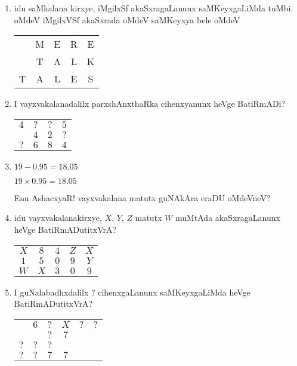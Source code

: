 \begin{enumerate}
\item idu saMkalana kirxye, iMgilxSf akaSxragaLanunx saMKeyxgaLiMda tuMbi. oMdeV iMgilxVSf akaSxrada oMdeV saMKeyxya bele oMdeV
\begin{center}
\begin{tabular}{ccccc}
 & {\rm M} & {\rm E} & {\rm R} & {\rm E}\\
 & {\rm T} & {\rm A} & {\rm L} & {\rm K}\\
\hline
{\rm T} & {\rm A} & {\rm L} & {\rm E} & {\rm S}
\end{tabular}
\end{center}

\item I vayxvakalanadalilx parxshAnxthaRka cihenxyanunx heVge BatiRmADi?
\begin{center}
\begin{tabular}{cccc}
$4$ & $?$ & $?$ & $5$\\
& $4$ & $2$ & $?$\\
\hline
$?$ & $6$ & $8$ & $4$
\end{tabular}
\end{center}

\item $19-0.95=18.05$

$19\times 0.95=18.05$

Enu AshacxyaR! vayxvakalana matutx guNAkAra eraDU oMdeVneV?

\item idu vayxvakalanakirxye, $X$, $Y$, $Z$ matutx $W$ muMtAda akaSxragaLanunx heVge BatiRmADutitxVrA?
\begin{center}
\begin{tabular}{ccccc}
$X$ & $8$ & $4$ & $Z$ & $X$\\
$1$ & $5$ & $0$ & $9$ & $Y$\\
\hline
$W$ & $X$ & $3$ & $0$ & $9$
\end{tabular}
\end{center}

\item I guNalabadhxdalilx $?$ cihenxgaLanunx saMKeyxgaLiMda heVge BatiRmADutitxVrA?
\begin{center}
\begin{tabular}{cccccc}
 & $6$ & $?$ & $X$ & $?$ & $?$\\
\cline{2-6}
& & $?$ & $7$ & & \\
$?$ & $?$ & $?$ &  & \\
\hline
$?$ & $?$ & $7$ & $7$ &&
\end{tabular}
\end{center}


\end{enumerate}
